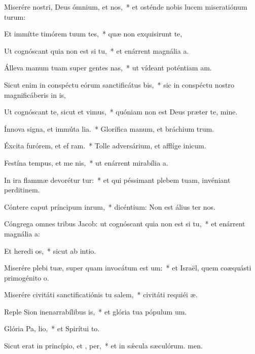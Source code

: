 \item Miserére nostri, Deus ómnium, et  nos,~* et osténde nobis lucem miseratiónum turum:
\item Et immítte timórem tuum  tes,~* quæ non exquisirunt te,
\item Ut cognóscant quia non est  si tu,~* et enárrent magnália a.
\item Álleva manum tuam super gentes nas,~* ut vídeant poténtiam am.
\item Sicut enim in conspéctu eórum sanctificátus   bis,~* sic in conspéctu nostro magnificáberis in is,
\item Ut cognóscant te, sicut et  vimus,~* quóniam non est Deus præter te, mine.
\item Ínnova signa, et immúta lia.~* Glorífica manum, et bráchium trum.
\item Éxcita furórem, et ef ram.~* Tolle adversárium, et afflíge inicum.
\item Festína tempus, et me nis,~* ut enárrent mirabília a.
\item In ira flammæ devorétur  tur:~* et qui péssimant plebem tuam, invéniant perditinem.
\item Cóntere caput príncipum inrum,~* dicéntium: Non est álius ter nos.
\item Cóngrega omnes tribus Jacob: ut cognóscant quia non est  si tu,~* et enárrent magnália a:
\item Et heredi os,~* sicut ab intio.
\item Miserére plebi tuæ, super quam invocátum est  um:~* et Israël, quem coæquásti primogénito o.
\item Miserére civitáti sanctificatiónis tu salem,~* civitáti requiéi æ.
\item Reple Sion inenarrabílibus  is,~* et glória tua pópulum um.
\item Glória Pa,  lio,~* et Spirítui to.
\item Sicut erat in princípio, et ,  per,~* et in sǽcula sæculórum. men.
